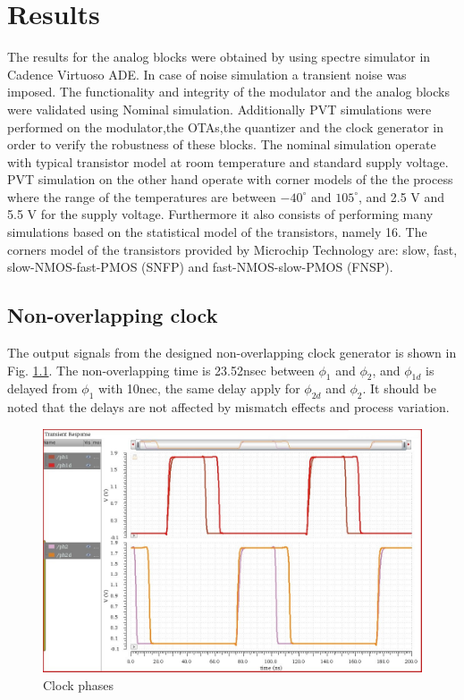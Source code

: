 \chapter{Results}\label{res:results}

The results for the analog blocks were obtained by using spectre simulator in Cadence Virtuoso ADE. In case of noise simulation a transient noise was imposed. The functionality and integrity of the modulator and the analog blocks were validated using Nominal simulation. Additionally PVT simulations were performed on the modulator,the OTAs,the quantizer and the clock generator in order to verify the robustness of these blocks. The nominal simulation operate with typical transistor model at room temperature and standard supply voltage. PVT simulation on the other hand operate with corner models of the the process where the range of the temperatures are between $-40^\circ$ and $105^\circ$, and 2.5 V and 5.5 V for the supply voltage. Furthermore it also consists of performing many simulations based on the statistical model of the transistors, namely 16. The corners model of the transistors provided by Microchip Technology are: slow, fast, slow-NMOS-fast-PMOS (SNFP) and fast-NMOS-slow-PMOS (FNSP). 


\section{Non-overlapping clock}
The output signals from the designed non-overlapping clock generator is shown in Fig. \ref{clock_out}. The non-overlapping time is 23.52nsec between $\phi_1$ and $\phi_2$, and $\phi_{1d}$ is delayed from $\phi_1$ with 10nec, the same delay apply for $\phi_{2d}$ and $\phi_2$. It should be noted that the delays are not affected by mismatch effects and process variation. 

\begin{figure}[h]
\centering
\includegraphics[width=\textwidth]{images/two_phase_clock_out.jpg}
\caption{Clock phases}
\label{clock_out}
\end{figure}

